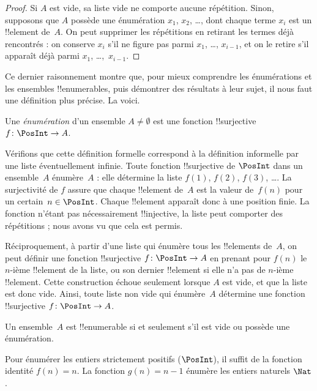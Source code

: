 \documentclass[../../../include/open-logic-section]{subfiles}
\begin{document}
\begin{proof}
Si $A$ est vide, sa liste vide ne comporte aucune répétition.
Sinon, supposons que $A$ possède une énumération $x_1$, $x_2$, \dots{}, dont
chaque terme $x_i$ est un !!{element} de~$A$. On peut supprimer les
répétitions en retirant les termes déjà rencontrés : on conserve $x_i$
s’il ne figure pas parmi $x_1$, \dots, $x_{i-1}$, et on le retire
s’il apparaît déjà parmi $x_1$, \dots,~$x_{i-1}$.
\end{proof}

Ce dernier raisonnement montre que, pour mieux comprendre les
énumérations et les ensembles !!{enumerable}s, puis démontrer des
résultats à leur sujet, il nous faut une définition plus précise.
La voici.

\begin{defn}
Une \emph{énumération} d’un ensemble $A \neq \emptyset$ est une
fonction !!{surjective} $f \colon \PosInt \to A$.
\end{defn}

\begin{explain}
Vérifions que cette définition formelle correspond à la définition
informelle par une liste éventuellement infinie. Toute fonction
!!{surjective} de $\PosInt$ dans un ensemble~$A$ énumère~$A$ : elle
détermine la liste $f(1)$, $f(2)$, $f(3)$, \dots. La surjectivité de $f$
assure que chaque !!{element} de~$A$ est la valeur de~$f(n)$ pour
un certain~$n \in \PosInt$. Chaque !!{element} apparaît donc à une
position finie. La fonction n’étant pas nécessairement !!{injective},
la liste peut comporter des répétitions ; nous avons vu que cela
est permis.

Réciproquement, à partir d’une liste qui énumère tous les !!{element}s
de~$A$, on peut définir une fonction !!{surjective} $f\colon \PosInt \to A$
en prenant pour $f(n)$ le $n$-ième !!{element} de la liste, ou son dernier
!!{element} si elle n’a pas de $n$-ième !!{element}. Cette construction
échoue seulement lorsque $A$ est vide, et que la liste est donc vide.
Ainsi, toute liste non vide qui énumère~$A$ détermine une fonction
!!{surjective} $f\colon \PosInt \to A$.
\end{explain}

\begin{defn}
Un ensemble~$A$ est !!{enumerable} si et seulement s’il est vide
ou possède une énumération.
\end{defn}

\begin{ex}
Pour énumérer les entiers strictement positifs ($\PosInt$), il suffit
de la fonction identité $f(n) = n$. La fonction $g(n) = n - 1$
énumère les entiers naturels $\Nat$.
\end{ex}
\end{document}
